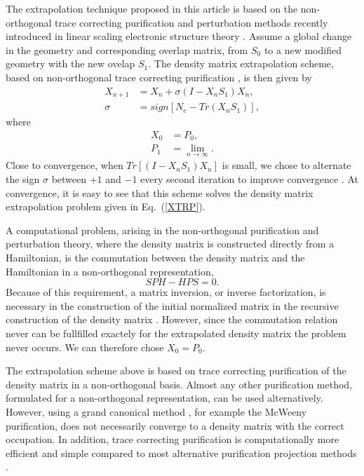 \documentclass[twocolumn,showpacs,preprintnumbers,amsmath,amssymb]{revtex4}
\begin{document}
The extrapolation technique proposed in this article is based on 
the non-orthogonal trace correcting purification 
and perturbation methods recently introduced in linear scaling electronic structure 
theory \cite{NiklassonTC2,NiklassonPRT1,WeberPRT2,NiklassonTRS4,NiklassonNO}.
Assume a global change in the geometry and corresponding overlap matrix, 
from $S_0$ to a new modified geometry with the new ovelap $S_1$.
The density matrix extrapolation scheme, based on non-orthogonal 
trace correcting purification \cite{NiklassonNO}, is then given by
\begin{equation}\begin{array}{ll}\label{XTRPP}
X_{n+1} & = X_n + \sigma (I-X_nS_1)X_n, \\
\sigma & = sign[N_e - Tr(X_nS_1)], \end{array}
\end{equation}
where 
\begin{equation}\begin{array}{ll}
X_0 & = P_0, \\
P_1 & = \lim_{n \rightarrow \infty}.
\end{array}
\end{equation}
Close to convergence, when $Tr[(I-X_nS_1)X_n]$ is small, we chose to alternate the sign $\sigma$
between $+1$ and $-1$ every second iteration to improve convergence \cite{NiklassonNO}.
At convergence, it is easy to see that this scheme solves the density matrix extrapolation
problem given in Eq.\ (\ref{XTRP}).

A computational problem, arising in
the non-orthogonal purification and perturbation theory, where the density matrix
is constructed directly from a Hamiltonian, is the commutation between
the density matrix and the Hamiltonian in a non-orthogonal representation,
\begin{equation}
SPH - HPS = 0.
\end{equation}
Because of this requirement,
a matrix inversion, or inverse factorization, is necessary in the construction of
the initial normalized matrix in the recursive construction of the density matrix \cite{NiklassonNO}.
However, since the commutation relation never can be fullfilled exactely
for the extrapolated density matrix the problem never occurs. We can therefore
chose $X_0 = P_0$.

The extrapolation scheme above is based on trace correcting purification of the density matrix
in a non-orthogonal basis. Almost any other purification method, formulated for a non-orthogonal
representation, can be used alternatively. However, using a grand canonical
method \cite{Palser98,Holas01,NiklassonTC2}, for example the McWeeny purification, 
does not necessarily converge to a density matrix
with the correct occupation.  In addition, trace correcting purification is computationally 
more efficient and simple compared to most alternative purification projection methods \cite{NiklassonTC2,
Mazziotti03,NiklassonIPUR}. 
\end{document}
